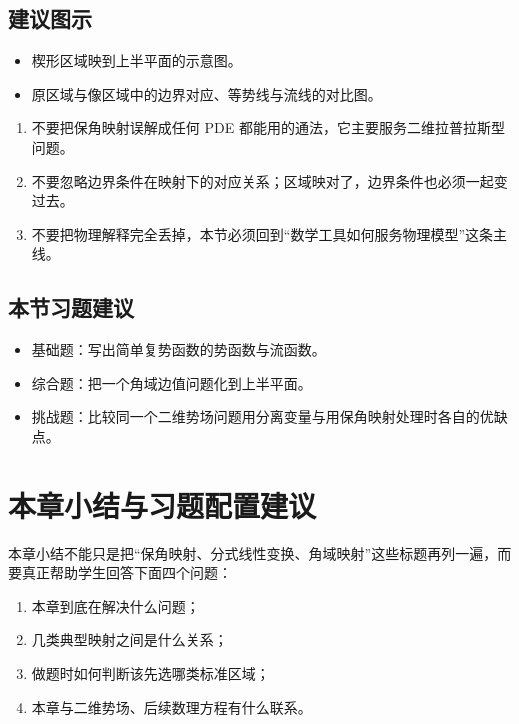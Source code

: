 \subsection*{建议图示}
\begin{itemize}
    \item 楔形区域映到上半平面的示意图。
    \item 原区域与像区域中的边界对应、等势线与流线的对比图。
\end{itemize}

\begin{jinshi}[本节易错点]
\begin{enumerate}
    \item 不要把保角映射误解成任何 PDE 都能用的通法，它主要服务二维拉普拉斯型问题。
    \item 不要忽略边界条件在映射下的对应关系；区域映对了，边界条件也必须一起变过去。
    \item 不要把物理解释完全丢掉，本节必须回到``数学工具如何服务物理模型''这条主线。
\end{enumerate}
\end{jinshi}

\subsection*{本节习题建议}
\begin{itemize}
    \item 基础题：写出简单复势函数的势函数与流函数。
    \item 综合题：把一个角域边值问题化到上半平面。
    \item 挑战题：比较同一个二维势场问题用分离变量与用保角映射处理时各自的优缺点。
\end{itemize}

\section{本章小结与习题配置建议}

\begin{wulibj}[小结应当完成的任务]
本章小结不能只是把``保角映射、分式线性变换、角域映射''这些标题再列一遍，而要真正帮助学生回答下面四个问题：
\begin{enumerate}
    \item 本章到底在解决什么问题；
    \item 几类典型映射之间是什么关系；
    \item 做题时如何判断该先选哪类标准区域；
    \item 本章与二维势场、后续数理方程有什么联系。
\end{enumerate}
\end{wulibj}

